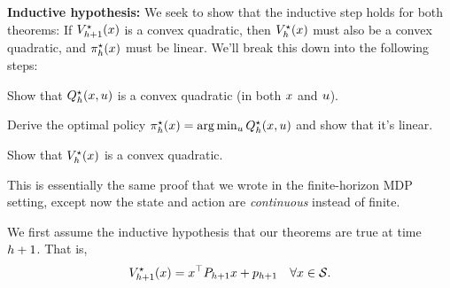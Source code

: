 \documentclass[../main/main]{subfiles}
\begin{document}
\textbf{Inductive hypothesis:} We seek to show that the inductive step holds for both theorems: If $V^\star_{h+1}(x)$ is a convex quadratic, then $V^\star_h(x)$ must also be a convex quadratic, and $\pi^\star_h(x)$ must be linear. We'll break this down into the following steps:
\begin{steps}
    \item Show that $Q^\star_h(x, u)$ is a convex quadratic (in both $x$ and $u$).
    \item Derive the optimal policy $\pi^\star_h(x) = \arg \min_u Q^\star_h(x, u)$ and show that it's linear.
    \item Show that $V^\star_h(x)$ is a convex quadratic.
\end{steps}
This is essentially the same proof that we wrote in the finite-horizon MDP setting,
except now the state and action are \emph{continuous} instead of finite.

We first assume the inductive hypothesis that our theorems are true at time $h+1$. That is,
\[ V^\star_{h+1}(x) = x^\top P_{h+1} x + p_{h+1} \quad \forall x \in \mathcal{S}. \]
\end{document}
